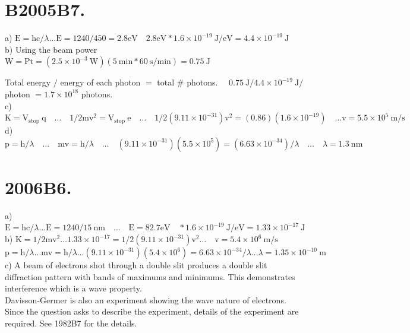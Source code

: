 \begin{enumerate}
\section*{B2005B7.}
a) $\mathrm{E}=\mathrm{hc} / \lambda \ldots \mathrm{E}=1240 / 450=2.8 \mathrm{eV} \quad 2.8 \mathrm{eV} * 1.6 \times 10^{-19} \mathrm{~J} / \mathrm{eV}=4.4 \times 10^{-19} \mathrm{~J}$\\
b) Using the beam power $\mathrm{W}=\mathrm{Pt}=\left(2.5 \times 10^{-3} \mathrm{~W}\right)(5 \mathrm{~min} * 60 \mathrm{~s} / \mathrm{min})=0.75 \mathrm{~J}$

Total energy $/$ energy of each photon $=$ total $\#$ photons. $\quad 0.75 \mathrm{~J} / 4.4 \times 10^{-19} \mathrm{~J} /$ photon $=1.7 \times 10^{18}$ photons.\\
c) $\mathrm{K}=\mathrm{V}_{\text {stop }} \mathrm{q} \quad \ldots \quad 1 / 2 \mathrm{mv}^{2}=\mathrm{V}_{\text {stop }} \mathrm{e} \quad \ldots \quad 1 / 2\left(9.11 \times 10^{-31}\right) \mathrm{v}^{2}=(0.86)\left(1.6 \times 10^{-19}\right) \quad \ldots \mathrm{v}=5.5 \times 10^{5} \mathrm{~m} / \mathrm{s}$\\
d) $\mathrm{p}=\mathrm{h} / \lambda \quad \ldots \quad \mathrm{mv}=\mathrm{h} / \lambda \quad \ldots \quad\left(9.11 \times 10^{-31}\right)\left(5.5 \times 10^{5}\right)=\left(6.63 \times 10^{-34}\right) / \lambda \quad \ldots \quad \lambda=1.3 \mathrm{~nm}$

\section*{2006B6.}
a) $\mathrm{E}=\mathrm{hc} / \lambda \ldots \mathrm{E}=1240 / 15 \mathrm{~nm} \quad \ldots \quad \mathrm{E}=82.7 \mathrm{eV} \quad * 1.6 \times 10^{-19} \mathrm{~J} / \mathrm{eV}=1.33 \times 10^{-17} \mathrm{~J}$\\
b) $\mathrm{K}=1 / 2 \mathrm{mv}^{2} \ldots 1.33 \times 10^{-17}=1 / 2\left(9.11 \times 10^{-31}\right) \mathrm{v}^{2} \ldots \quad \mathrm{v}=5.4 \times 10^{6} \mathrm{~m} / \mathrm{s}$\\
$\mathrm{p}=\mathrm{h} / \lambda \ldots \mathrm{mv}=\mathrm{h} / \lambda \ldots\left(9.11 \times 10^{-31}\right)\left(5.4 \times 10^{6}\right)=6.63 \times 10^{-34} / \lambda \ldots \lambda=1.35 \times 10^{-10} \mathrm{~m}$\\
c) A beam of electrons shot through a double slit produces a double slit diffraction pattern with bands of maximums and minimums. This demonstrates interference which is a wave property.\\
Davisson-Germer is also an experiment showing the wave nature of electrons. Since the question asks to describe the experiment, details of the experiment are required. See 1982B7 for the details.


\end{enumerate}
